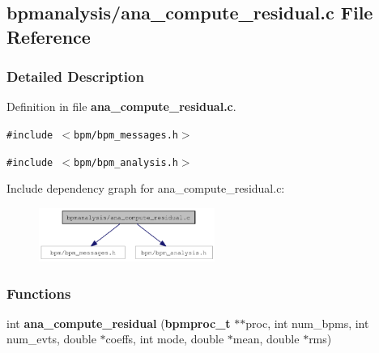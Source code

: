 \subsection{bpmanalysis/ana\_\-compute\_\-residual.c File Reference}
\label{ana__compute__residual_8c}


\subsubsection{Detailed Description}


Definition in file {\bf ana\_\-compute\_\-residual.c}.

{\tt \#include $<$bpm/bpm\_\-messages.h$>$}\par
{\tt \#include $<$bpm/bpm\_\-analysis.h$>$}\par


Include dependency graph for ana\_\-compute\_\-residual.c:\nopagebreak
\begin{figure}[H]
\begin{center}
\leavevmode
\includegraphics[width=163pt]{ana__compute__residual_8c__incl}
\end{center}
\end{figure}
\subsubsection*{Functions}
\begin{CompactItemize}
\item 
int {\bf ana\_\-compute\_\-residual} ({\bf bpmproc\_\-t} $\ast$$\ast$proc, int num\_\-bpms, int num\_\-evts, double $\ast$coeffs, int mode, double $\ast$mean, double $\ast$rms)
\end{CompactItemize}
